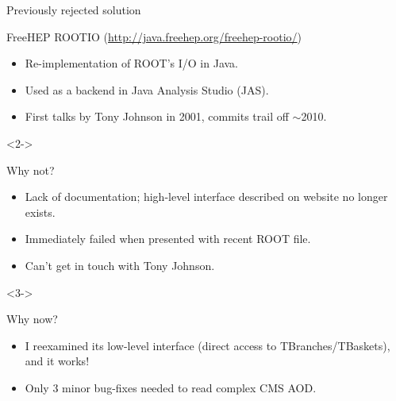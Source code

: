 \documentclass{beamer}
\begin{document}
\begin{frame}{Previously rejected solution}
\vspace{0.35 cm}
\begin{block}{FreeHEP ROOTIO \scriptsize (\textcolor{blue}{\url{http://java.freehep.org/freehep-rootio/}})}
\vspace{-0.1 cm}
\begin{itemize}
\item Re-implementation of ROOT's I/O in Java.
\item Used as a backend in Java Analysis Studio (JAS).
\item First talks by Tony Johnson in 2001, commits trail off $\sim$2010.
\end{itemize}
\end{block}

\vspace{-0.25 cm}
\begin{uncoverenv}<2->
\begin{block}{Why not?}
\vspace{-0.1 cm}
\begin{itemize}
\item Lack of documentation; high-level interface described on website no longer exists.
\item Immediately failed when presented with recent ROOT file.
\item Can't get in touch with Tony Johnson.
\end{itemize}
\end{block}
\end{uncoverenv}

\vspace{-0.25 cm}
\begin{uncoverenv}<3->
\begin{block}{Why now?}
\vspace{-0.1 cm}
\begin{itemize}
\item I reexamined its low-level interface (direct access to TBranches/TBaskets), and it works!
\item Only 3 minor bug-fixes needed to read complex CMS AOD.
\end{itemize}
\end{block}
\end{uncoverenv}
\end{frame}
\end{document}
